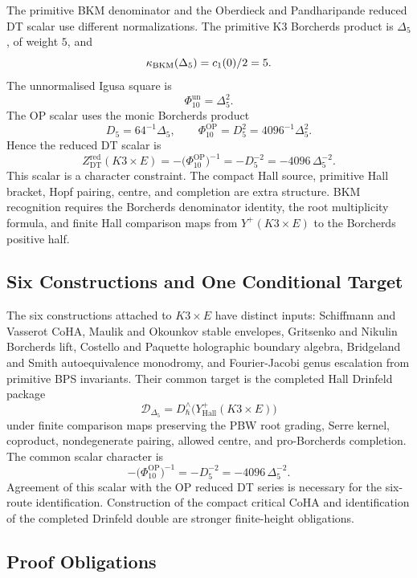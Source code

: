 The primitive BKM denominator and the Oberdieck and Pandharipande
reduced DT scalar use different normalizations. The primitive K3
Borcherds product is \(\Delta_5\), of weight \(5\), and
\[
 \kappa_{\mathrm{BKM}}(\Delta_5)=c_1(0)/2=5.
\]
The unnormalised Igusa square is
\[
 \Phi_{10}^{\mathrm{un}}=\Delta_5^2.
\]
The OP scalar uses the monic Borcherds product
\[
 D_5=64^{-1}\Delta_5,
 \qquad
 \Phi_{10}^{\mathrm{OP}}=D_5^2=4096^{-1}\Delta_5^2.
\]
Hence the reduced DT scalar is
\[
 Z_{\mathrm{DT}}^{\mathrm{red}}(K3\times E)
 =
 -\bigl(\Phi_{10}^{\mathrm{OP}}\bigr)^{-1}
 =
 -D_5^{-2}
 =
 -4096\,\Delta_5^{-2}.
\]
This scalar is a character constraint. The compact Hall source,
primitive Hall bracket, Hopf pairing, centre, and completion are extra
structure. BKM recognition requires the Borcherds denominator identity,
the root multiplicity formula, and finite Hall comparison maps from
\(Y^{+}(K3\times E)\) to the Borcherds positive half.

\subsection*{Six Constructions and One Conditional Target}
\label{note:six-constructions}

The six constructions attached to \(K3\times E\) have distinct inputs:
Schiffmann and Vasserot CoHA, Maulik and Okounkov stable envelopes,
Gritsenko and Nikulin Borcherds lift, Costello and Paquette holographic
boundary algebra, Bridgeland and Smith autoequivalence monodromy, and
Fourier-Jacobi genus escalation from primitive BPS invariants. Their
common target is the completed Hall Drinfeld package
\[
 \mathscr D_{\Delta_5}
 =
 D^\wedge_\hbar\!\bigl(Y^+_{\mathrm{Hall}}(K3\times E)\bigr)
\]
under finite comparison maps preserving the PBW root grading,
Serre kernel, coproduct, nondegenerate pairing, allowed centre, and
pro-Borcherds completion. The common scalar character is
\[
 -\bigl(\Phi_{10}^{\mathrm{OP}}\bigr)^{-1}
 =
 -D_5^{-2}
 =
 -4096\,\Delta_5^{-2}.
\]
Agreement of this scalar with the OP reduced DT series is necessary
for the six-route identification. Construction of the compact critical
CoHA and identification of the completed Drinfeld double are stronger
finite-height obligations.

\subsection*{Proof Obligations}
\label{note:proof-obligations}

